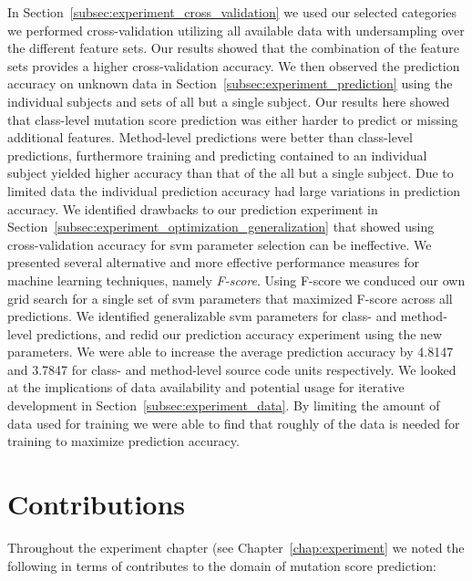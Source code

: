 In Section~\ref{subsec:experiment_cross_validation} we used our selected categories we performed cross-validation utilizing all available data with undersampling over the different feature sets. Our results showed that the combination of the feature sets provides a higher cross-validation accuracy. We then observed the prediction accuracy on unknown data in Section~\ref{subsec:experiment_prediction} using the individual subjects and sets of all but a single subject. Our results here showed that class-level mutation score prediction was either harder to predict or missing additional features. Method-level predictions were better than class-level predictions, furthermore training and predicting contained to an individual subject yielded higher accuracy than that of the all but a single subject. Due to limited data the individual prediction accuracy had large variations in prediction accuracy. We identified drawbacks to our prediction experiment in Section~\ref{subsec:experiment_optimization_generalization} that showed using cross-validation accuracy for \gls{svm} parameter selection can be ineffective. We presented several alternative and more effective performance measures for machine learning techniques, namely \emph{F-score}. Using F-score we conduced our own grid search for a single set of \gls{svm} parameters that maximized F-score across all predictions. We identified generalizable \gls{svm} parameters for class- and method-level predictions, and redid our prediction accuracy experiment using the new parameters. We were able to increase the average prediction accuracy by 4.8147 and 3.7847 for class- and method-level source code units respectively. We looked at the implications of data availability and potential usage for iterative development in Section~\ref{subsec:experiment_data}. By limiting the amount of data used for training we were able to find that roughly  of the data is needed for training to maximize prediction accuracy. 


\section{Contributions}
\label{sec:conclusions_contributions}
Throughout the experiment chapter (see Chapter~\ref{chap:experiment} we noted the following in terms of contributes to the domain of mutation score prediction:

